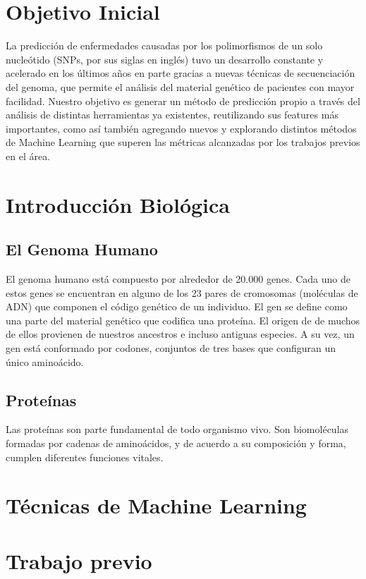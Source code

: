 \section{Objetivo Inicial}

La predicción de enfermedades causadas por los polimorfismos de un solo nucleótido (SNPs, por sus siglas en inglés) tuvo un desarrollo constante y acelerado en los últimos años en parte gracias a nuevas técnicas de secuenciación del genoma, que permite el análisis del material genético de pacientes con mayor facilidad. Nuestro objetivo es generar un método de predicción propio a través del análisis de distintas herramientas ya existentes, reutilizando sus features más importantes, como así también agregando nuevos y explorando distintos métodos de Machine Learning que superen las métricas alcanzadas por los trabajos previos en el área.


\section{Introducción Biológica}

\subsection{El Genoma Humano}

El genoma humano está compuesto por alrededor de 20.000 genes. Cada uno de estos genes se encuentran en alguno de los 23 pares de cromosomas (moléculas de ADN) que componen el código genético de un individuo. 
El gen se define como una parte del material genético que codifica una proteína. El origen de de muchos de ellos provienen de nuestros ancestros e incluso antiguas especies. A su vez, un gen está conformado por codones, conjuntos de tres bases que configuran un único aminoácido.


\subsection{Proteínas}

Las proteínas son parte fundamental de todo organismo vivo. Son biomoléculas formadas por cadenas de aminoácidos, y de acuerdo a su composición y forma, cumplen diferentes funciones vitales.



\section{Técnicas de Machine Learning}

\section{Trabajo previo}
